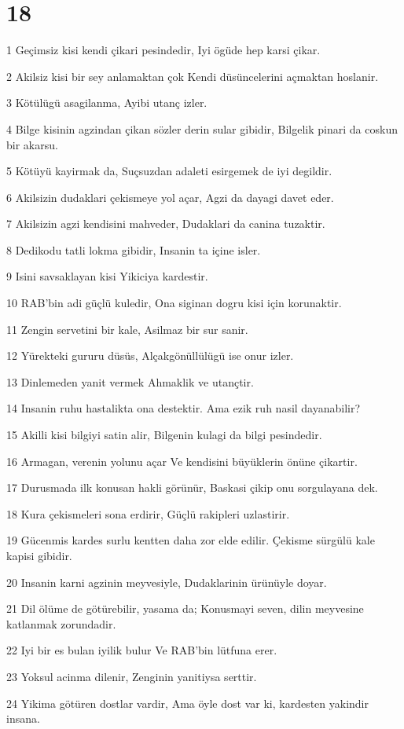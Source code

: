 \chapter{18}

\par 1 Geçimsiz kisi kendi çikari pesindedir, Iyi ögüde hep karsi çikar.
\par 2 Akilsiz kisi bir sey anlamaktan çok Kendi düsüncelerini açmaktan hoslanir.
\par 3 Kötülügü asagilanma, Ayibi utanç izler.
\par 4 Bilge kisinin agzindan çikan sözler derin sular gibidir, Bilgelik pinari da coskun bir akarsu.
\par 5 Kötüyü kayirmak da, Suçsuzdan adaleti esirgemek de iyi degildir.
\par 6 Akilsizin dudaklari çekismeye yol açar, Agzi da dayagi davet eder.
\par 7 Akilsizin agzi kendisini mahveder, Dudaklari da canina tuzaktir.
\par 8 Dedikodu tatli lokma gibidir, Insanin ta içine isler.
\par 9 Isini savsaklayan kisi Yikiciya kardestir.
\par 10 RAB'bin adi güçlü kuledir, Ona siginan dogru kisi için korunaktir.
\par 11 Zengin servetini bir kale, Asilmaz bir sur sanir.
\par 12 Yürekteki gururu düsüs, Alçakgönüllülügü ise onur izler.
\par 13 Dinlemeden yanit vermek Ahmaklik ve utançtir.
\par 14 Insanin ruhu hastalikta ona destektir. Ama ezik ruh nasil dayanabilir?
\par 15 Akilli kisi bilgiyi satin alir, Bilgenin kulagi da bilgi pesindedir.
\par 16 Armagan, verenin yolunu açar Ve kendisini büyüklerin önüne çikartir.
\par 17 Durusmada ilk konusan hakli görünür, Baskasi çikip onu sorgulayana dek.
\par 18 Kura çekismeleri sona erdirir, Güçlü rakipleri uzlastirir.
\par 19 Gücenmis kardes surlu kentten daha zor elde edilir. Çekisme sürgülü kale kapisi gibidir.
\par 20 Insanin karni agzinin meyvesiyle, Dudaklarinin ürünüyle doyar.
\par 21 Dil ölüme de götürebilir, yasama da; Konusmayi seven, dilin meyvesine katlanmak zorundadir.
\par 22 Iyi bir es bulan iyilik bulur Ve RAB'bin lütfuna erer.
\par 23 Yoksul acinma dilenir, Zenginin yanitiysa serttir.
\par 24 Yikima götüren dostlar vardir, Ama öyle dost var ki, kardesten yakindir insana.

